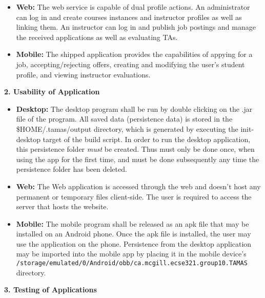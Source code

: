\documentclass[12pt]{article}
\begin{document}
\begin{itemize}
	\item \textbf{Web:} The web service is capable of dual profile actions. An administrator can log in and create courses instances and instructor profiles as well as linking them. An instructor can log in and publish job postings and manage the received applications as well as evaluating TAs.
    
	\item \textbf{Mobile:} The shipped application provides the capabilities of appying for a job,
		accepting/rejecting offers, creating and modifying the user's student profile, and viewing
		instructor evaluations. 

\end{itemize}

\textbf{2. Usability of Application}

\begin{itemize}
	\item \textbf{Desktop:} The desktop program shall be run by double clicking on the .jar file of
		the program. All saved data (persistence data) is stored in the \$HOME/.tamas/output
		directory, which is generated by executing the init-desktop target of the build script. In
		order to run the desktop application, this persistence folder \textit{must} be created. Thus
		must only be done once, when using the app for the first time, and must be done subsequently
		any time the persistence folder has been deleted.
	\item \textbf{Web:} The Web application is accessed through the web and doesn't host any permanent or temporary files client-side. The user is required to access the server that hosts the website.
	
	\item \textbf{Mobile:} The mobile program shall be released as an apk file that may be installed
		on an Android phone. Once the apk file is installed, the user may use the application on the
		phone. Persistence from the desktop application may be imported into the mobile app by
		placing it in the mobile device's
		\texttt{/storage/emulated/0/Android/obb/ca.mcgill.ecse321.group10.TAMAS} directory.
\end{itemize}

\textbf{3. Testing of Applications}
\end{document}
